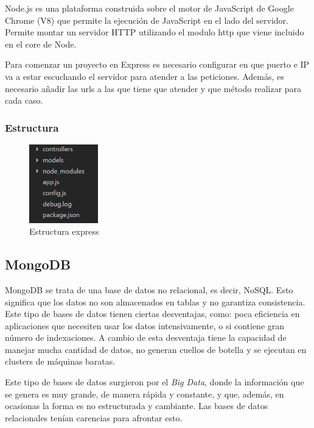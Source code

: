\documentclass[a4paper, 12pt]{book}
\begin{document}
Node.js es una plataforma construida sobre el motor de JavaScript de Google Chrome (V8)
que permite la ejecuci\'on de JavaScript en el lado del servidor. Permite montar un servidor HTTP
utilizando el modulo http que viene incluido en el core de Node.

Para comenzar un proyecto en Express es necesario configurar en que puerto e IP va a estar
escuchando el servidor para atender a las peticiones. Adem\'as, es necesario a\~nadir las urls a las
que tiene que atender y que m\'etodo realizar para cada caso.

\subsubsection{Estructura}
\label{subsec:estilo}

\begin{figure}[H]
  \centering
  \includegraphics[width=3cm, keepaspectratio]{img/estructura_express}
  \caption{Estructura express}
  \label{figura:estructura_express}
\end{figure}


\subsection{MongoDB}
\label{subsec:estilo}

MongoDB\cite{MongoDB} se trata de una base de datos no relacional, es decir, NoSQL. Esto significa que los datos no
son almacenados en tablas y no garantiza consistencia. Este tipo de bases de datos tienen ciertas
desventajas, como: poca eficiencia en aplicaciones que necesiten usar los datos intensivamente,
o si contiene gran n\'umero de indexaciones. A cambio de esta desventaja tiene la capacidad de
manejar mucha cantidad de datos, no generan cuellos de botella y se ejecutan en clusters de
m\'aquinas baratas.

Este tipo de bases de datos surgieron por el \emph{Big Data}, donde la informaci\'on que se genera
es muy grande, de manera r\'apida y constante, y que, adem\'as, en ocasionas la forma es no
estructurada y cambiante. Las bases de datos relacionales ten\'ian carencias para afrontar esto.
\end{document}
